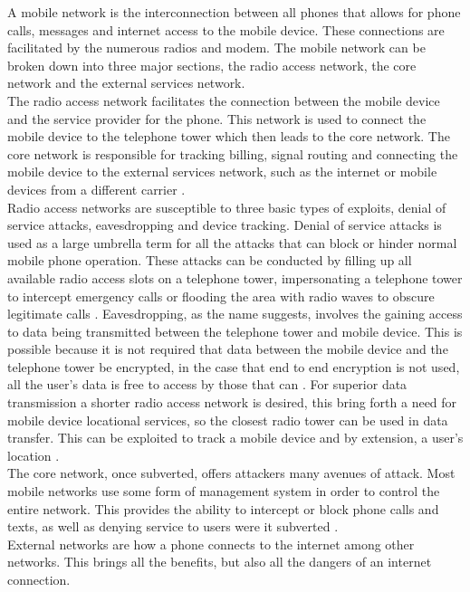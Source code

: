 A mobile network is the interconnection between all phones that allows for phone calls, messages and internet access to the mobile device.
These connections are facilitated by the numerous radios and modem.
The mobile network can be broken down into three major sections, the radio access network, the core network and the external services network.\\
The radio access network facilitates the connection between the mobile device and the service provider for the phone.
This network is used to connect the mobile device to the telephone tower which then leads to the core network.
The core network is responsible for tracking billing, signal routing and connecting the mobile device to the external services network, such as the internet or mobile devices from a different carrier \cite{Reference13}.\\ 
Radio access networks are susceptible to three basic types of exploits, denial of service attacks, eavesdropping and device tracking.
Denial of service attacks is used as a large umbrella term for all the attacks that can block or hinder normal mobile phone operation.
These attacks can be conducted by filling up all available radio access slots on a telephone tower, impersonating a telephone tower to intercept emergency calls or flooding the area with radio waves to obscure legitimate calls \cite{Reference17}.
Eavesdropping, as the name suggests, involves the gaining access to data being transmitted between the telephone tower and mobile device.
This is possible because it is not required that data between the mobile device and the telephone tower be encrypted, in the case that end to end encryption is not used, all the user’s data is free to access by those that can \cite{Reference13}.
For superior data transmission a shorter radio access network is desired, this bring forth a need for mobile device locational services, so the closest radio tower can be used in data transfer.
This can be exploited to track a mobile device and by extension, a user’s location \cite{Reference17}.\\
The core network, once subverted, offers attackers many avenues of attack.
Most mobile networks use some form of management system in order to control the entire network.
This provides the ability to intercept or block phone calls and texts, as well as denying service to users were it subverted \cite{Reference13}.\\
External networks are how a phone connects to the internet among other networks.
This brings all the benefits, but also all the dangers of an internet connection.\\
